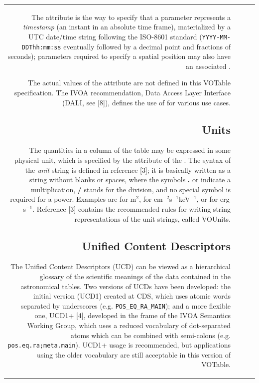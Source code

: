 \begin{tabular}{RRCp{0.8\textwidth}}
\begin{center}
The  attribute is the way to 
specify that a parameter represents a {\em  timestamp} 
(an instant in an absolute time frame), materialized by a 
UTC date/time string following the ISO-8601 standard 
({\tt YYYY-MM-DDThh:mm:ss} eventually followed by a decimal point 
and fractions of seconds);
parameters required to specify a spatial position may also have an associated
.

The actual values of the  attribute are not defined
in this VOTable specification.  The IVOA recommendation, Data Access Layer Interface 
(DALI, see [8]), defines the use of  for various use cases.

\subsection{Units}
\label{sec:unit}

The quantities in a column of the table may be expressed in
some physical unit,
which is specified by the {}
attribute of the {}.
The  syntax of the {\em unit} string is defined in reference [3];
it is basically written as a string without blanks or spaces,
where the symbols {\bf.} or {\bf*} indicate a multiplication,
{\bf/} stands for the division, and no special symbol is required
for a power.
Examples are  for m$^2$,
 for cm$^{-2}$s$^{-1}$keV$^{-1}$,
or  for erg\,s$^{-1}$.
Reference [3] contains the recommended rules for writing string
representations of the unit strings, called VOUnits.

\subsection{Unified Content Descriptors}
\label{sec:ucd}

The Unified Content Descriptors (UCD) can be viewed as a 
hierarchical glossary of the scientific meanings of the data 
contained in the astronomical tables.
Two versions of UCDs have been developed:
the initial version (UCD1) created at CDS, which uses
atomic words separated by underscores (e.g. {\tt POS\_EQ\_RA\_MAIN});
and a more flexible one, UCD1+ [4],
developed in the frame of the IVOA Semantics Working Group, which uses
a reduced vocabulary of dot-separated atoms which can be
combined with semi-colons (e.g. {\tt pos.eq.ra;meta.main}).
UCD1+ usage is recommended, but applications using the older
vocabulary are still acceptable in this version of VOTable.


\end{center}
\end{tabular}
